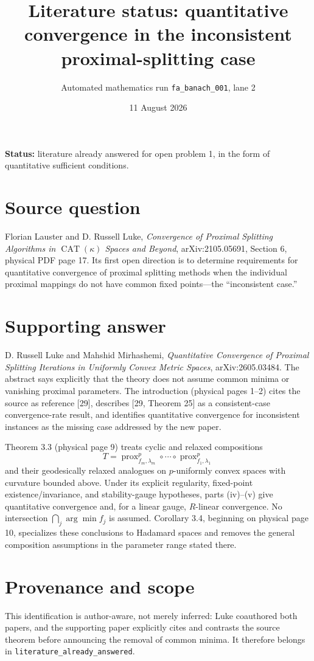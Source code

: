 \documentclass[11pt]{article}
\title{Literature status: quantitative convergence in the inconsistent proximal-splitting case}
\author{Automated mathematics run \texttt{fa\_banach\_001}, lane 2}
\date{11 August 2026}
\begin{document}
\maketitle

\noindent\textbf{Status:} literature already answered for open problem 1,
in the form of quantitative sufficient conditions.

\section*{Source question}
Florian Lauster and D. Russell Luke,
\emph{Convergence of Proximal Splitting Algorithms in
$\operatorname{CAT}(\kappa)$ Spaces and Beyond}, arXiv:2105.05691,
Section 6, physical PDF page 17.  Its first open direction is to determine
requirements for quantitative convergence of proximal splitting methods when
the individual proximal mappings do not have common fixed points---the
``inconsistent case.''

\section*{Supporting answer}
D. Russell Luke and Mahshid Mirhashemi,
\emph{Quantitative Convergence of Proximal Splitting Iterations in Uniformly
Convex Metric Spaces}, arXiv:2605.03484.  The abstract says explicitly that
the theory does not assume common minima or vanishing proximal parameters.
The introduction (physical pages 1--2) cites the source as reference [29],
describes [29, Theorem 25] as a consistent-case convergence-rate result, and
identifies quantitative convergence for inconsistent instances as the missing
case addressed by the new paper.

Theorem 3.3 (physical page 9) treats cyclic and relaxed compositions
\[
 T=\operatorname{prox}^{p}_{f_m,\lambda_m}\circ\cdots\circ
   \operatorname{prox}^{p}_{f_1,\lambda_1}
\]
and their geodesically relaxed analogues on $p$-uniformly convex spaces with
curvature bounded above.  Under its explicit regularity, fixed-point
existence/invariance, and stability-gauge hypotheses, parts (iv)--(v) give
quantitative convergence and, for a linear gauge, $R$-linear convergence.
No intersection $\bigcap_j\arg\min f_j$ is assumed.  Corollary 3.4, beginning
on physical page 10, specializes these conclusions to Hadamard spaces and
removes the general composition assumptions in the parameter range stated
there.

\section*{Provenance and scope}
This identification is author-aware, not merely inferred: Luke coauthored
both papers, and the supporting paper explicitly cites and contrasts the
source theorem before announcing the removal of common minima.  It therefore
belongs in \texttt{literature\_already\_answered}.
\end{document}
